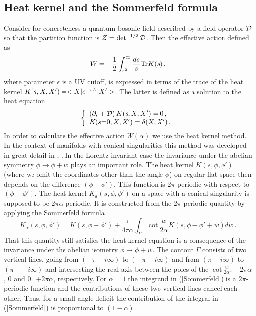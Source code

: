 \documentclass[12pt]{article}
\def\Tr{\hbox{Tr}}
\def\lb{\label}
\begin{document}
\subsection{Heat kernel and the Sommerfeld formula}
\lb{Heat kernel}
Consider for concreteness a quantum bosonic field  described by a field operator $\cal D$ so that the partition function is $Z=\det^{-1/2}{\cal D}$. Then the effective action defined as
 \begin{equation}
  W=-\frac{1}{ 2}\int_{\epsilon^2}^\infty \frac{ds}{ s}\Tr K (s)\lb{W}\,,
 \end{equation}
where parameter $\epsilon$ is a UV cutoff, is expressed in terms of the trace of the heat kernel $K(s,X,X')=<X|e^{-s{\cal D}}|X'>$. The latter is defined as a solution  to the heat  equation
 \begin{equation}\label{K}
  \left\{
  \begin{array}{l}
    (\partial_s+{\cal D}) \,K(s,X,X')=0 \,, \\
    K(s{=}0,X,X')=\delta(X,X') \,.
  \end{array}
    \right.
 \end{equation}
In order to calculate the effective action $W(\alpha)$ we use the heat kernel method. In the context of  manifolds with conical singularities this method was  developed in great detail in \cite{Dowker:1977zj}, \cite{Fursaev:1994in}. In the Lorentz invariant case  the invariance under the abelian symmetry $\phi\rightarrow \phi +w$ plays an important role. The heat kernel $K(s,\phi,\phi')$ (where we omit the coordinates other than the angle $\phi$) on regular flat space  then depends on the difference $(\phi-\phi')$. This function is $2\pi$ periodic with respect to $(\phi-\phi')$. The heat kernel $K_\alpha (s,\phi,\phi')$ on a space with a conical singularity is supposed to be $2\pi\alpha$ periodic. It is  constructed from the $2\pi$ periodic  quantity by applying the Sommerfeld formula
\cite{Sommerfeld}
  \begin{equation}
   K_\alpha(s,\phi,\phi')
    = K(s,\phi-\phi')  + \frac{ i}{4\pi\alpha}\int_\Gamma \cot \frac{w}{2\alpha} K(s,\phi-\phi'+w)dw \,.
  \label{Sommerfeld}
  \end{equation}
That this quantity still satisfies the heat kernel equation is a consequence of the invariance under the abelian isometry $\phi\rightarrow \phi +w$.
The contour $\Gamma$
consists of two vertical lines, going from $(-\pi+ i \infty )$
to $(-\pi- i \infty )$ and from $(\pi- i \infty )$ to
$(\pi-+ i \infty )$ and intersecting the real axis between the
poles of the $\cot \frac{w}{2\alpha}$: $-2\pi\alpha$, $0$ and $0,$
$+2\pi\alpha$, respectively. For $\alpha=1$ the integrand in
(\ref{Sommerfeld}) is a $2\pi$-periodic function and the
contributions of these two vertical lines cancel each other. Thus,
for a small angle deficit the contribution of the integral in
(\ref{Sommerfeld}) is proportional to $(1-\alpha)$.
\end{document}
